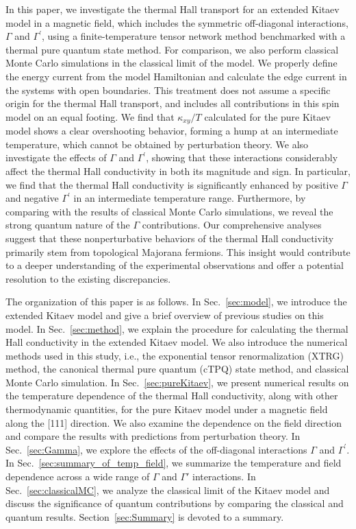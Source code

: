\documentclass[twocolumn,superscriptaddress,showpacs, longbibliography, aps, prx]{revtex4-2}
\begin{document}
In this paper, we investigate the thermal Hall transport for an extended Kitaev model in a magnetic field, which includes the symmetric off-diagonal interactions, $\Gamma$ and $\Gamma^\prime$, using a finite-temperature tensor network method benchmarked with a thermal pure quantum state method. 
For comparison, we also perform classical Monte Carlo simulations in the classical limit of the model. 
We properly define the energy current from the model Hamiltonian and calculate the edge current in the systems with open boundaries. 
This treatment does not assume a specific origin for the thermal Hall transport, and includes all contributions in this spin model on an equal footing. 
We find that $\kappa_{xy}/T$ calculated for the pure Kitaev model shows a clear overshooting behavior, forming a hump at an intermediate temperature, which cannot be obtained by perturbation theory. 
We also investigate the effects of $\Gamma$ and $\Gamma^\prime$, showing that these interactions considerably affect the thermal Hall conductivity in both its magnitude and sign.
In particular, we find that the thermal Hall conductivity is significantly enhanced by positive $\Gamma$ and negative $\Gamma^\prime$ in an intermediate temperature range. 
Furthermore, by comparing with the results of classical Monte Carlo simulations, we reveal the strong quantum nature of the $\Gamma$ contributions. 
Our comprehensive analyses suggest that these nonperturbative behaviors of the thermal Hall conductivity primarily stem from topological Majorana fermions. 
This insight would contribute to a deeper understanding of the experimental observations and offer a potential resolution to the existing discrepancies. 

The organization of this paper is as follows. 
In Sec.~\ref{sec:model}, we introduce the extended Kitaev model and give a brief overview of previous studies on this model. 
In Sec.~\ref{sec:method}, we explain the procedure for calculating the thermal Hall conductivity in the extended Kitaev model. 
We also introduce the numerical methods used in this study, i.e., the exponential tensor renormalization (XTRG) method, the canonical thermal pure quantum (cTPQ) state method, and classical Monte Carlo simulation.
In Sec.~\ref{sec:pureKitaev}, we present numerical results on the temperature dependence of the thermal Hall conductivity, along with other thermodynamic quantities, for the pure Kitaev model under a magnetic field along the [111] direction. 
We also examine the dependence on the field direction and compare the results with predictions from perturbation theory. 
In Sec.~\ref{sec:Gamma}, we explore the effects of the off-diagonal interactions $\Gamma$ and $\Gamma^{\prime}$. 
In Sec.~\ref{sec:summary_of_temp_field}, we summarize the temperature and field dependence across a wide range of $\Gamma$ and $\Gamma'$ interactions.
In Sec.~\ref{sec:classicalMC}, we analyze the classical limit of the Kitaev model and discuss the significance of quantum contributions by comparing the classical and quantum results.
Section~\ref{sec:Summary} is devoted to a summary.
\end{document}
